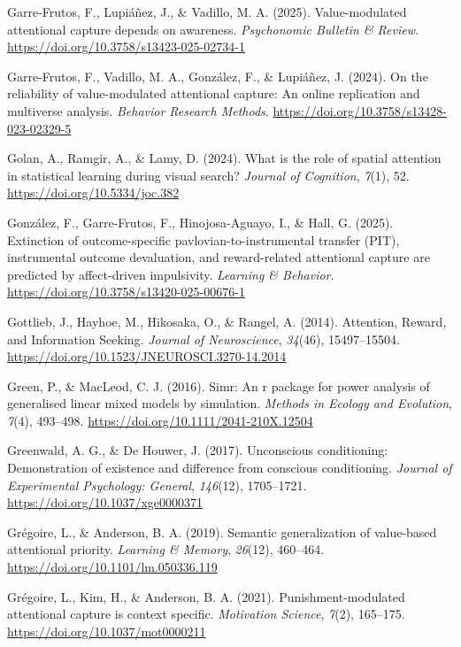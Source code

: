 \documentclass[
  man,
  floatsintext,
  longtable,
  nolmodern,
  notxfonts,
  notimes,
  mask,
  colorlinks=true,linkcolor=blue,citecolor=blue,urlcolor=blue]{apa7}
\newlength{\cslhangindent}
\newenvironment{CSLReferences}[2] %
 {\begin{list}{}{%
  \setlength{\itemindent}{0pt}
  \setlength{\leftmargin}{0pt}
  \setlength{\parsep}{0pt}
  \ifodd #1
   \setlength{\leftmargin}{\cslhangindent}
   \setlength{\itemindent}{-1\cslhangindent}
  \fi
  \setlength{\itemsep}{#2\baselineskip}}}
 {\end{list}}
\begin{document}
\begin{CSLReferences}{1}{0}
Garre-Frutos, F., Lupiáñez, J., \& Vadillo, M. A. (2025).
Value-modulated attentional capture depends on awareness.
\emph{Psychonomic Bulletin \& Review}.
\url{https://doi.org/10.3758/s13423-025-02734-1}

Garre-Frutos, F., Vadillo, M. A., González, F., \& Lupiáñez, J. (2024).
On the reliability of value-modulated attentional capture: An online
replication and multiverse analysis. \emph{Behavior Research Methods}.
\url{https://doi.org/10.3758/s13428-023-02329-5}

Golan, A., Ramgir, A., \& Lamy, D. (2024). What is the role of spatial
attention in statistical learning during visual search? \emph{Journal of
Cognition}, \emph{7}(1), 52. \url{https://doi.org/10.5334/joc.382}

González, F., Garre-Frutos, F., Hinojosa-Aguayo, I., \& Hall, G. (2025).
Extinction of outcome-specific pavlovian-to-instrumental transfer (PIT),
instrumental outcome devaluation, and reward-related attentional capture
are predicted by affect-driven impulsivity. \emph{Learning \& Behavior}.
\url{https://doi.org/10.3758/s13420-025-00676-1}

Gottlieb, J., Hayhoe, M., Hikosaka, O., \& Rangel, A. (2014). Attention,
Reward, and Information Seeking. \emph{Journal of Neuroscience},
\emph{34}(46), 15497--15504.
\url{https://doi.org/10.1523/JNEUROSCI.3270-14.2014}

Green, P., \& MacLeod, C. J. (2016). Simr: An r package for power
analysis of generalised linear mixed models by simulation. \emph{Methods
in Ecology and Evolution}, \emph{7}(4), 493--498.
\url{https://doi.org/10.1111/2041-210X.12504}

Greenwald, A. G., \& De Houwer, J. (2017). Unconscious conditioning:
Demonstration of existence and difference from conscious conditioning.
\emph{Journal of Experimental Psychology: General}, \emph{146}(12),
1705--1721. \url{https://doi.org/10.1037/xge0000371}

Grégoire, L., \& Anderson, B. A. (2019). Semantic generalization of
value-based attentional priority. \emph{Learning \& Memory},
\emph{26}(12), 460--464. \url{https://doi.org/10.1101/lm.050336.119}

Grégoire, L., Kim, H., \& Anderson, B. A. (2021). Punishment-modulated
attentional capture is context specific. \emph{Motivation Science},
\emph{7}(2), 165--175. \url{https://doi.org/10.1037/mot0000211}


\end{CSLReferences}
\end{document}
